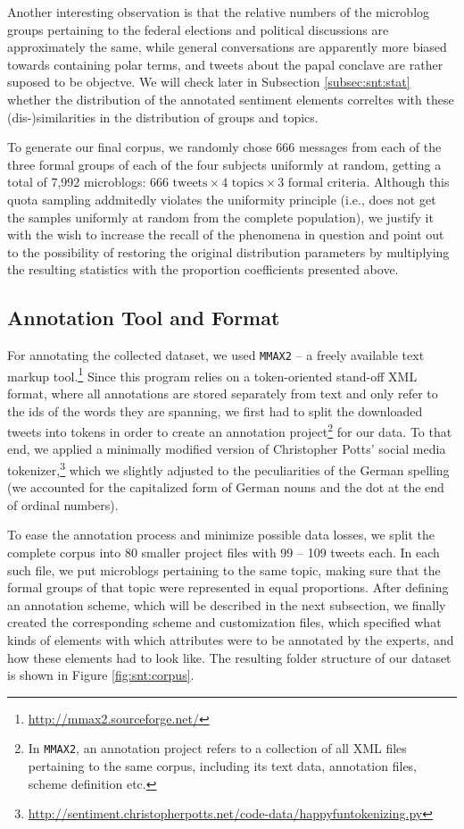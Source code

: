 Another interesting observation is that the relative numbers of the
microblog groups pertaining to the federal elections and political
discussions are approximately the same, while general conversations
are apparently more biased towards containing polar terms, and tweets
about the papal conclave are rather suposed to be objectve.  We will
check later in Subsection \ref{subsec:snt:stat} whether the
distribution of the annotated sentiment elements correltes with these
(dis-)similarities in the distribution of groups and topics.

To generate our final corpus, we randomly chose 666 messages from each
of the three formal groups of each of the four subjects uniformly at
random, getting a total of 7,992 microblogs: $666\text{ tweets} \times
4\text{ topics} \times 3\text{ formal criteria}$.  Although this quota
sampling addmitedly violates the uniformity principle (i.e., does not
get the samples uniformly at random from the complete population), we
justify it with the wish to increase the recall of the phenomena in
question and point out to the possibility of restoring the original
distribution parameters by multiplying the resulting statistics with
the proportion coefficients presented above.

\subsection{Annotation Tool and Format}\label{subsec:snt:tformat}

For annotating the collected dataset, we used \texttt{MMAX2} -- a
freely available text markup
tool.\footnote{\url{http://mmax2.sourceforge.net/}} Since this program
relies on a token-oriented stand-off XML format, where all annotations
are stored separately from text and only refer to the ids of the words
they are spanning, we first had to split the downloaded tweets into
tokens in order to create an annotation project\footnote{In
  \texttt{MMAX2}, an annotation project refers to a collection of all
  XML files pertaining to the same corpus, including its text data,
  annotation files, scheme definition etc.} for our data.  To that
end, we applied a minimally modified version of Christopher Potts'
social media
tokenizer,\footnote{\url{http://sentiment.christopherpotts.net/code-data/happyfuntokenizing.py}}
which we slightly adjusted to the peculiarities of the German spelling
(we accounted for the capitalized form of German nouns and the dot at
the end of ordinal numbers).

To ease the annotation process and minimize possible data losses, we
split the complete corpus into 80 smaller project files with 99 -- 109
tweets each.  In each such file, we put microblogs pertaining to the
same topic, making sure that the formal groups of that topic were
represented in equal proportions.  After defining an annotation
scheme, which will be described in the next subsection, we finally
created the corresponding scheme and customization files, which
specified what kinds of elements with which attributes were to be
annotated by the experts, and how these elements had to look like.
The resulting folder structure of our dataset is shown in Figure
\ref{fig:snt:corpus}.

